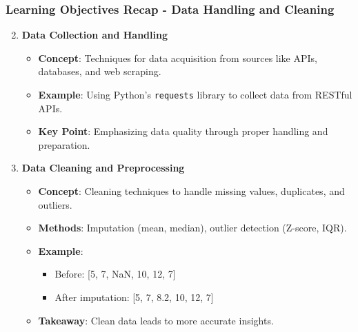 \documentclass[aspectratio=169]{beamer}
\begin{document}
\begin{frame}[fragile]
    \frametitle{Learning Objectives Recap - Data Handling and Cleaning}
    \begin{enumerate}
        \setcounter{enumi}{1}
        \item \textbf{Data Collection and Handling}
        \begin{itemize}
            \item \textbf{Concept}: Techniques for data acquisition from sources like APIs, databases, and web scraping.
            \item \textbf{Example}: Using Python's \texttt{requests} library to collect data from RESTful APIs.
            \item \textbf{Key Point}: Emphasizing data quality through proper handling and preparation.
        \end{itemize}
        
        \item \textbf{Data Cleaning and Preprocessing}
        \begin{itemize}
            \item \textbf{Concept}: Cleaning techniques to handle missing values, duplicates, and outliers.
            \item \textbf{Methods}: Imputation (mean, median), outlier detection (Z-score, IQR).
            \item \textbf{Example}: 
                \begin{itemize}
                    \item Before: [5, 7, NaN, 10, 12, 7]
                    \item After imputation: [5, 7, 8.2, 10, 12, 7]
                \end{itemize}
            \item \textbf{Takeaway}: Clean data leads to more accurate insights.
        \end{itemize}
    \end{enumerate}
\end{frame}
\end{document}
